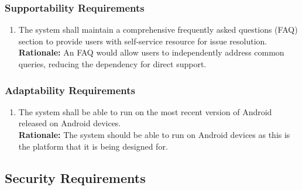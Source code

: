 \documentclass[]{article}
\begin{document}
\subsubsection{Supportability Requirements}
\label{ssub:supportability_requirements}
\begin{enumerate}[{MS-S}1. ]
	\item The system shall maintain a comprehensive frequently asked questions (FAQ) section to provide users with self-service
	resource for issue resolution. \\
	{\bf Rationale:} An FAQ would allow users to independently address common queries, reducing the dependency for direct 
	support.
\end{enumerate}

\subsubsection{Adaptability Requirements}
\label{ssub:adaptability_requirements}
\begin{enumerate}[{MS-A}1. ]
	\item The system shall be able to run on the most recent version of Android released on Android devices. \\
	{\bf Rationale:} The system should be able to run on Android devices as this is the platform that it is being designed for.
\end{enumerate}




\subsection{Security Requirements}
\label{sub:security_requirements}
\end{document}
